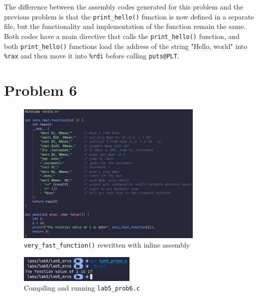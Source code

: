 \documentclass{article}
\begin{document}
The difference between the assembly codes generated for this problem and the previous problem is that the \texttt{print\_hello()} function is now defined in a separate file, but the functionality and implementation of the function remain the same.
Both codes have a main directive that calls the \texttt{print\_hello()} function, and both \texttt{print\_hello()} functions load the address of the string "Hello, world" into \texttt{\%rax} and then move it into \texttt{\%rdi} before calling \texttt{puts@PLT}.


\section*{Problem 6}

\begin{figure}[H]
    \centering
    \includegraphics[width=0.8\textwidth]{../images/prob6_code.png}
    \caption{\texttt{very\_fast\_function()} rewritten with inline assembly}
\end{figure}

\begin{figure}[H]
    \centering
    \includegraphics[width=0.5\textwidth]{../images/prob6_out.png}
    \caption{Compiling and running \texttt{lab5\_prob6.c}}
\end{figure}
\end{document}
